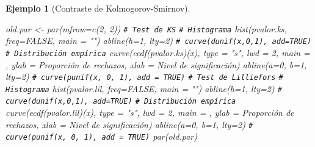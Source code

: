 \documentclass[
  10pt,
]{book}
\newenvironment{Shaded}{\begin{snugshade}}{\end{snugshade}}
\newcommand{\AttributeTok}[1]{\textcolor[rgb]{0.77,0.63,0.00}{#1}}
\newcommand{\CommentTok}[1]{\textcolor[rgb]{0.56,0.35,0.01}{\textit{#1}}}
\newcommand{\ConstantTok}[1]{\textcolor[rgb]{0.00,0.00,0.00}{#1}}
\newcommand{\DecValTok}[1]{\textcolor[rgb]{0.00,0.00,0.81}{#1}}
\newcommand{\FunctionTok}[1]{\textcolor[rgb]{0.00,0.00,0.00}{#1}}
\newcommand{\NormalTok}[1]{#1}
\newcommand{\OtherTok}[1]{\textcolor[rgb]{0.56,0.35,0.01}{#1}}
\newcommand{\StringTok}[1]{\textcolor[rgb]{0.31,0.60,0.02}{#1}}
\theoremstyle{break}
\newtheorem{example}{Ejemplo}[chapter]
\theoremstyle{nonumberplain}
\renewcommand{\CommentTok}[1]{\textcolor[rgb]{0.41,0.41,0.41}{\texttt{#1}}}
\begin{document}
\begin{example}[Contraste de Kolmogorov-Smirnov]
\begin{Shaded}
\begin{Highlighting}[]
\NormalTok{old.par }\OtherTok{\textless{}{-}} \FunctionTok{par}\NormalTok{(}\AttributeTok{mfrow=}\FunctionTok{c}\NormalTok{(}\DecValTok{2}\NormalTok{, }\DecValTok{2}\NormalTok{))}
\CommentTok{\# Test de KS}
  \CommentTok{\# Histograma}
\FunctionTok{hist}\NormalTok{(pvalor.ks, }\AttributeTok{freq=}\ConstantTok{FALSE}\NormalTok{, }\AttributeTok{main =} \StringTok{""}\NormalTok{)}
\FunctionTok{abline}\NormalTok{(}\AttributeTok{h=}\DecValTok{1}\NormalTok{, }\AttributeTok{lty=}\DecValTok{2}\NormalTok{)   }\CommentTok{\# curve(dunif(x,0,1), add=TRUE)}
  \CommentTok{\# Distribución empírica}
\FunctionTok{curve}\NormalTok{(}\FunctionTok{ecdf}\NormalTok{(pvalor.ks)(x), }\AttributeTok{type =} \StringTok{"s"}\NormalTok{, }\AttributeTok{lwd =} \DecValTok{2}\NormalTok{, }\AttributeTok{main =} \StringTok{\textquotesingle{}\textquotesingle{}}\NormalTok{, }
      \AttributeTok{ylab =} \StringTok{\textquotesingle{}Proporción de rechazos\textquotesingle{}}\NormalTok{, }\AttributeTok{xlab =} \StringTok{\textquotesingle{}Nivel de significación\textquotesingle{}}\NormalTok{)}
\FunctionTok{abline}\NormalTok{(}\AttributeTok{a=}\DecValTok{0}\NormalTok{, }\AttributeTok{b=}\DecValTok{1}\NormalTok{, }\AttributeTok{lty=}\DecValTok{2}\NormalTok{)   }\CommentTok{\# curve(punif(x, 0, 1), add = TRUE)}
\CommentTok{\# Test de Lilliefors}
  \CommentTok{\# Histograma}
\FunctionTok{hist}\NormalTok{(pvalor.lil, }\AttributeTok{freq=}\ConstantTok{FALSE}\NormalTok{, }\AttributeTok{main =} \StringTok{""}\NormalTok{)}
\FunctionTok{abline}\NormalTok{(}\AttributeTok{h=}\DecValTok{1}\NormalTok{, }\AttributeTok{lty=}\DecValTok{2}\NormalTok{)   }\CommentTok{\# curve(dunif(x,0,1), add=TRUE)}
  \CommentTok{\# Distribución empírica}
\FunctionTok{curve}\NormalTok{(}\FunctionTok{ecdf}\NormalTok{(pvalor.lil)(x), }\AttributeTok{type =} \StringTok{"s"}\NormalTok{, }\AttributeTok{lwd =} \DecValTok{2}\NormalTok{, }\AttributeTok{main =} \StringTok{\textquotesingle{}\textquotesingle{}}\NormalTok{, }
      \AttributeTok{ylab =} \StringTok{\textquotesingle{}Proporción de rechazos\textquotesingle{}}\NormalTok{,  }\AttributeTok{xlab =} \StringTok{\textquotesingle{}Nivel de significación\textquotesingle{}}\NormalTok{)}
\FunctionTok{abline}\NormalTok{(}\AttributeTok{a=}\DecValTok{0}\NormalTok{, }\AttributeTok{b=}\DecValTok{1}\NormalTok{, }\AttributeTok{lty=}\DecValTok{2}\NormalTok{)   }\CommentTok{\# curve(punif(x, 0, 1), add = TRUE)}
\FunctionTok{par}\NormalTok{(old.par)}
\end{Highlighting}
\end{Shaded}


\end{example}
\end{document}
